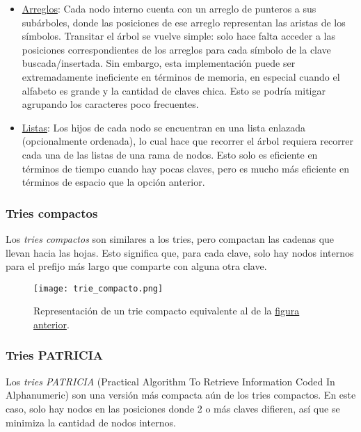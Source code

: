 \documentclass{article}
\begin{document}
    \begin{itemize}
        \item \underline{Arreglos}: Cada nodo interno cuenta con un arreglo de punteros a sus subárboles, donde las posiciones de ese arreglo representan las aristas de los símbolos. Transitar el árbol se vuelve simple: solo hace falta acceder a las posiciones correspondientes de los arreglos para cada símbolo de la clave buscada/insertada. Sin embargo, esta implementación puede ser extremadamente ineficiente en términos de memoria, en especial cuando el alfabeto es grande y la cantidad de claves chica. Esto se podría mitigar agrupando los caracteres poco frecuentes.
        \item \underline{Listas}: Los hijos de cada nodo se encuentran en una lista enlazada (opcionalmente ordenada), lo cual hace que recorrer el árbol requiera recorrer cada una de las listas de una rama de nodos. Esto solo es eficiente en términos de tiempo cuando hay pocas claves, pero es mucho más eficiente en términos de espacio que la opción anterior.
    \end{itemize}

    \subsubsection{Tries compactos}

    Los \textit{tries compactos} son similares a los tries, pero compactan las cadenas que llevan hacia las hojas. Esto significa que, para cada clave, solo hay nodos internos para el prefijo más largo que comparte con alguna otra clave.

    \begin{figure}[H]
        \centering
        \texttt{[image: trie\_compacto.png]}
        \caption*{Representación de un trie compacto equivalente al de la \hyperref[fig-trie]{figura anterior}.}
    \end{figure}

    \subsubsection{Tries PATRICIA}

    Los \textit{tries PATRICIA} (Practical Algorithm To Retrieve Information Coded In
    Alphanumeric) son una versión más compacta aún de los tries compactos. En este caso, solo hay nodos en las posiciones donde 2 o más claves difieren, así que se minimiza la cantidad de nodos internos.
\end{document}
